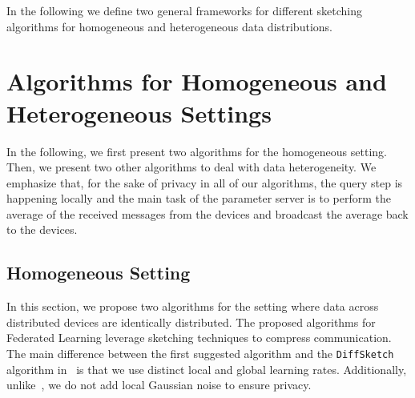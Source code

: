 \documentclass[twoside]{article}
\begin{document}
In the following we define two general frameworks for different sketching algorithms for homogeneous and heterogeneous data distributions.

\section{Algorithms for Homogeneous and Heterogeneous Settings}\label{sec:algos}
In the following, we first present two algorithms for the homogeneous setting.
Then, we present two other algorithms to deal with data heterogeneity. 
We emphasize that, for the sake of privacy in all of our algorithms, the query step is happening locally and the main task of the parameter server is to perform the average of the received messages from the devices and broadcast the average back to the devices.   

\subsection{Homogeneous Setting}
In this section, we propose two algorithms for the setting where data across distributed devices are  identically distributed. 
The proposed algorithms for Federated Learning leverage sketching techniques to compress communication.
The main difference between the first suggested algorithm and the \texttt{DiffSketch} algorithm in~\cite{li2019privacy} is that we use distinct local and global learning rates. Additionally, unlike~\cite{li2019privacy}, we do not add local Gaussian noise to ensure privacy. 
\end{document}
